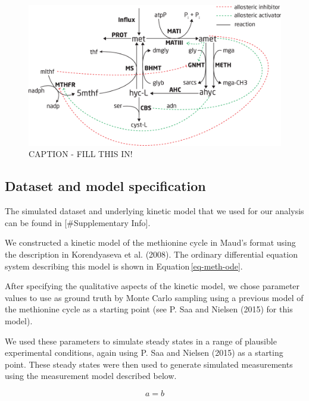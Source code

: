 \documentclass[
  letterpaper,
  DIV=11,
  numbers=noendperiod]{scrartcl}
\begin{document}
\begin{figure}

{\centering \includegraphics{./figures/methionine-reactions.png}

}

\caption{\label{fig-methionine-reactions}CAPTION - FILL THIS IN!}

\end{figure}

\hypertarget{dataset-and-model-specification}{%
\subsection{Dataset and model
specification}\label{dataset-and-model-specification}}

The simulated dataset and underlying kinetic model that we used for our
analysis can be found in {[}\#Supplementary Info{]}.

We constructed a kinetic model of the methionine cycle in Maud's format
using the description in Korendyaseva et al. (2008). The ordinary
differential equation system describing this model is shown in
Equation\,\eqref{eq-meth-ode}.

After specifying the qualitative aspects of the kinetic model, we chose
parameter values to use as ground truth by Monte Carlo sampling using a
previous model of the methionine cycle as a starting point (see P. Saa
and Nielsen (2015) for this model).

We used these parameters to simulate steady states in a range of
plausible experimental conditions, again using P. Saa and Nielsen (2015)
as a starting point. These steady states were then used to generate
simulated measurements using the measurement model described below.

\begin{equation}
a = b \label{eq-meth-ode}
\end{equation}
\end{document}
